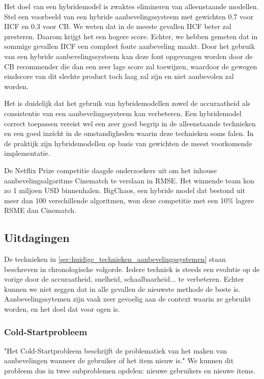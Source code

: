 Het doel van een hybridemodel is zwaktes elimineren van alleenstaande modellen. Stel een voorbeeld van een hybride aanbevelingssysteem met gewichten 0.7 voor IICF en 0.3 voor CB. We weten dat in de meeste gevallen IICF beter zal presteren. Daarom krijgt het een hogere score. Echter, we hebben gemeten dat in sommige gevallen IICF een compleet foute aanbeveling maakt. Door het gebruik van een hybride aanbevelingssysteem kan deze fout opgevangen worden door de CB recommender die dan een zeer lage score zal toewijzen, waardoor de gewogen eindscore van dit slechte product toch laag zal zijn en niet aanbevolen zal worden.

Het is duidelijk dat het gebruik van hybridemodellen zowel de accuraatheid als consistentie van een aanbevelingssysteem kan verbeteren. Een hybridemodel correct toepassen vereist wel een zeer goed begrip in de alleenstaande technieken en een goed inzicht in de omstandigheden waarin deze technieken soms falen. In de praktijk zijn hybridemodellen op basis van gewichten de meest voorkomende implementatie. \cite{hybrid_recsys_literature_overview}

De Netflix Prize competitie daagde onderzoekers uit om het inhouse aanbevelingsalgoritme Cinematch te verslaan in RMSE. Het winnende team kon zo 1 miljoen USD binnenhalen. BigChaos, een hybride model dat bestond uit meer dan 100 verschillende algoritmen, won deze competitie met een  10\% lagere RSME dan Cinematch. \cite{netflix_hybrid}

\subsection{Uitdagingen}
De technieken in \autoref{sec:huidige_technieken_aanbevelingssystemen} staan beschreven in chronologische volgorde. Iedere techniek is steeds een evolutie op de vorige door de accuraatheid, snelheid, schaalbaarheid... te verbeteren. Echter kunnen we niet zeggen dat in alle gevallen de nieuwste methode de beste is. Aanbevelingssytemen zijn vaak zeer gevoelig aan de context waarin ze gebruikt worden, en het doel dat voor ogen is.


\subsubsection{Cold-Startprobleem}
\label{sec:chapt2_cold_start}
"Het Cold-Startprobleem beschrijft de problematiek van het maken van aanbevelingen wanneer de gebruiker of het item nieuw is." \cite{coldstart_cf} We kunnen dit probleem dus in twee subproblemen opdelen: nieuwe gebruikers en nieuwe items.

